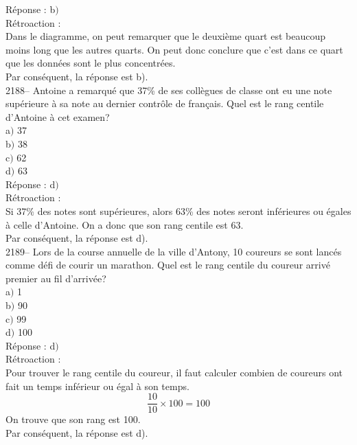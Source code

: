 \documentclass[letterpaper, 12pt]{article}
\begin{document}
R\'eponse : b$)$\\

R\'etroaction :\\
Dans le diagramme, on peut remarquer que le deuxi\`eme quart est beaucoup moins long que les autres quarts. On peut donc conclure que c'est dans ce quart que les donn\'ees sont le plus concentr\'ees. \\
Par cons\'equent, la r\'eponse est b).\\


2188-- Antoine a remarqu\'e que 37\% de ses coll\`egues de classe ont eu une note sup\'erieure \`a sa note au dernier contr\^ole de fran\c cais. Quel est le rang centile d'Antoine \`a cet examen? \\

a$)$ 37\\
b$)$ 38\\
c$)$ 62\\
d$)$ 63\\

R\'eponse : d$)$\\

R\'etroaction :\\
Si 37\% des notes sont sup\'erieures, alors 63\% des notes seront inf\'erieures ou \'egales \`a celle d'Antoine. On a donc que son rang centile est 63.\\
Par cons\'equent, la r\'eponse est d).\\

2189-- Lors de la course annuelle de la ville d'Antony, 10 coureurs se sont lanc\'es comme d\'efi de courir un marathon. Quel est le rang centile du coureur arriv\'e premier au fil d'arriv\'ee?\\

a$)$ 1\\
b$)$ 90\\
c$)$ 99\\
d$)$ 100\\

R\'eponse : d$)$\\

R\'etroaction :\\
Pour trouver le rang centile du coureur, il faut calculer combien de coureurs ont fait un temps inf\'erieur ou \'egal \`a son temps. \\
\begin{equation*}
 \frac{10}{10}\times 100 = 100
\end{equation*}
On trouve que son rang est 100.\\
Par cons\'equent, la r\'eponse est d).\\
\end{document}
